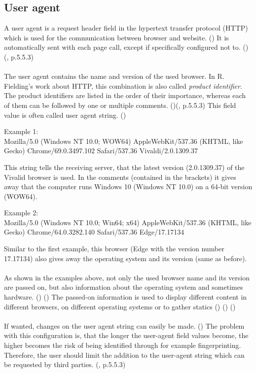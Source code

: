 \subsection{User agent}\label{UAS}
A user agent is a request header field in the hypertext transfer protocol (HTTP) which is used for the communication between browser and website. (\textcite{xovi18}) It is automatically sent with each page call, except if specifically configured not to. (\textcite{xovi18})(\textcite{fielding14}, p.5.5.3)\\\\
The user agent contains the name and version of the used browser. In R. Fielding's work about HTTP, this combination is also called \textit{product identifier}. The product identifiers are listed in the order of their importance, whereas each of them can be followed by one or multiple comments. (\textcite{xovi18})(\textcite{fielding14}, p.5.5.3) This field value is often called user agent string. (\textcite{hoffman16})\\
\begin{tcolorbox}
Example 1: \\
Mozilla/5.0 (Windows NT 10.0; WOW64) AppleWebKit/537.36 (KHTML, like Gecko) Chrome/69.0.3497.102 Safari/537.36 Vivaldi/2.0.1309.37
\end{tcolorbox}
This string tells the receiving server, that the latest version (2.0.1309.37) of the Vivalid browser is used. In the comments (contained in the brackets) it gives away that the computer runs Windows 10 (Windows NT 10.0) on a 64-bit version (WOW64).\\
\begin{tcolorbox}
Example 2:\\
Mozilla/5.0 (Windows NT 10.0; Win64; x64) AppleWebKit/537.36 (KHTML, like Gecko) Chrome/64.0.3282.140 Safari/537.36 Edge/17.17134\\
\end{tcolorbox}
Similar to the first example, this browser (Edge with the version number 17.17134) also gives away the operating system and its version (same as before).\\\\
As shown in the examples above, not only the used browser name and its version are passed on, but also information about the operating system and sometimes hardware. (\textcite{hoffman16}) (\textcite{xovi18}) The passed-on information is used to display different content in different browsers, on different operating systems or to gather statics (\textcite{hoffman16}) (\textcite{arntz17}) (\textcite{xovi18})\\\\
If wanted, changes on the user agent string can easily be made. (\textcite{arntz17})
The problem with this configuration is, that the longer the user-agent field values become, the higher becomes the risk of being identified through for example fingerprinting. Therefore, the user should limit the addition to the user-agent string which can be requested by third parties. (\textcite{fielding14}, p.5.5.3)

